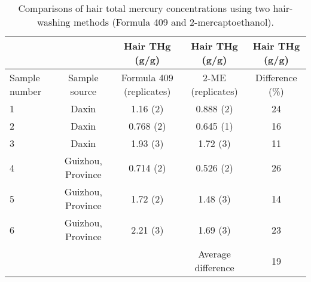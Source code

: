 \begin{table}[htp]
\tiny
\caption[Comparisons of hair total mercury concentrations]{Comparisons of hair total mercury concentrations using two hair-washing methods (Formula 409 and 2-mercaptoethanol). }
\begin{center}
\begin{tabular}{|p{1.4cm}|c|c|c|c|}
\hline
 &  & Hair THg (g/g) & Hair THg (g/g) & Hair THg (g/g)  \\ \hline
Sample number & Sample source & Formula 409 (replicates) & 2-ME (replicates) & Difference (\%)  \\ \hline
1 & Daxin & 1.16 (2) & 0.888 (2) & 24  \\ \hline
2 & Daxin & 0.768 (2) & 0.645 (1) & 16  \\ \hline
3 & Daxin & 1.93 (3) & 1.72 (3) & 11  \\ \hline
4 & Guizhou, Province & 0.714 (2) & 0.526 (2) & 26  \\ \hline
5 & Guizhou, Province & 1.72 (2) & 1.48 (3) & 14  \\ \hline
6 & Guizhou, Province & 2.21 (3) & 1.69 (3) & 23  \\ \hline
 &  &  & Average difference & 19  \\ \hline
\end{tabular}
\end{center}
\label{default}
\end{table}